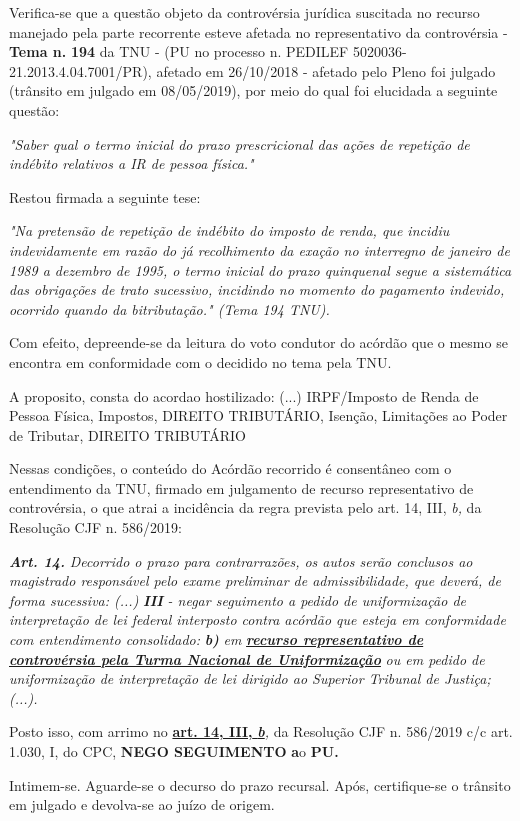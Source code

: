 \documentclass[12pt]{article}
\begin{document}
\justifying
\noindent Verifica-se que a questão objeto da controvérsia jurídica suscitada no recurso manejado pela parte recorrente esteve afetada no representativo da controvérsia - \textbf{Tema n. }\textbf{194} da TNU - (PU no processo n. PEDILEF 5020036-21.2013.4.04.7001/PR),  afetado em 26/10/2018 - afetado pelo Pleno foi julgado (trânsito em julgado em 08/05/2019), por meio do qual foi elucidada a seguinte questão:

\noindent \textit{"Saber qual o termo inicial do prazo prescricional das ações de repetição de indébito relativos a IR de pessoa física."}

\noindent Restou firmada a seguinte tese:

\noindent \textit{"Na pretensão de repetição de indébito do imposto de renda, que incidiu indevidamente em razão do já recolhimento da exação no interregno de janeiro de 1989 a dezembro de 1995, o termo inicial do prazo quinquenal segue a sistemática das obrigações de trato sucessivo, incidindo no momento do pagamento indevido, ocorrido quando da bitributação." (Tema 194 TNU).}

\noindent Com efeito, depreende-se da leitura do voto condutor do acórdão que o mesmo se encontra em conformidade com o decidido no  tema pela TNU.

\noindent A proposito, consta do acordao hostilizado: (...) IRPF/Imposto de Renda de Pessoa Física, Impostos, DIREITO TRIBUTÁRIO, Isenção, Limitações ao Poder de Tributar, DIREITO TRIBUTÁRIO

\noindent Nessas condições, o conteúdo do Acórdão recorrido é consentâneo com o entendimento da TNU, firmado em julgamento de recurso representativo de controvérsia, o que atrai a incidência da regra prevista pelo art. 14, III, \textit{b,} da Resolução CJF n. 586/2019:

\noindent \textit{\textbf{Art. 14.}}\textit{ Decorrido o prazo para contrarrazões, os autos serão conclusos ao magistrado responsável pelo exame preliminar de admissibilidade, que deverá, de forma sucessiva: (...) }\textit{\textbf{III }}\textit{- negar seguimento a pedido de uniformização de interpretação de lei federal interposto contra acórdão que esteja em conformidade com entendimento consolidado: }\textit{\textbf{b)}}\textit{ em }\uline{\textit{\textbf{recurso representativo de controvérsia pela Turma Nacional de Uniformização}}}\textit{ ou em pedido de uniformização de interpretação de lei dirigido ao Superior Tribunal de Justiça;(...).}

\noindent Posto isso, com arrimo no \uline{\textbf{art. 14, III, }}\uline{\textit{\textbf{b}}}\textit{,} da Resolução CJF n. 586/2019 c/c art. 1.030, I, do CPC, \textbf{NEGO SEGUIMENTO }\textbf{a}o\textbf{ PU}\textbf{.}

\noindent Intimem-se. Aguarde-se o decurso do prazo recursal. Após, certifique-se o trânsito em julgado e devolva-se ao juízo de origem.
\end{document}
